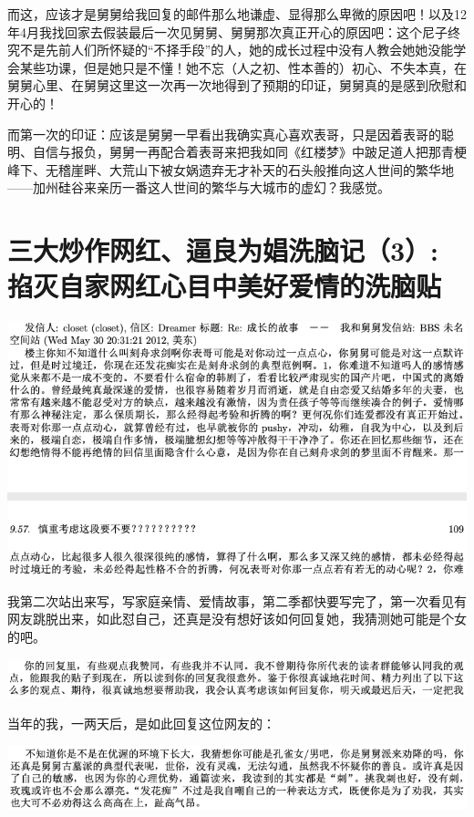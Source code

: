 \documentclass[9pt, b5paper]{article}
\begin{document}
而这，应该才是舅舅给我回复的邮件那么地谦虚、显得那么卑微的原因吧！以及12年4月我找回家去假装最后一次见舅舅、舅舅那次真正开心的原因吧：这个尼子终究不是先前人们所怀疑的“不择手段”的人，她的成长过程中没有人教会她她没能学会某些功课，但是她只是不懂！她不忘（人之初、性本善的）初心、不失本真，在舅舅心里、在舅舅这里这一次再一次地得到了预期的印证，舅舅真的是感到欣慰和开心的！

而第一次的印证：应该是舅舅一早看出我确实真心喜欢表哥，只是因着表哥的聪明、自信与报负，舅舅一再配合着表哥来把我如同《红楼梦》中跛足道人把那青梗峰下、无稽崖畔、大荒山下被女娲遗弃无才补天的石头般推向这人世间的繁华地——加州硅谷来亲历一番这人世间的繁华与大城市的虚幻？我感觉。

\section{三大炒作网红、逼良为娼洗脑记（3）: 掐灭自家网红心目中美好爱情的洗脑贴}
\label{sec:orgf2cd519}

\begin{center}
\includegraphics[width=.9\linewidth]{./pic/p1p108-3.png}
\end{center}

我第二次站出来写，写家庭亲情、爱情故事，第二季都快要写完了，第一次看见有网友跳脱出来，如此怼自己，还真是没有想好该如何回复她，我猜测她可能是个女的吧。 

\begin{center}
\includegraphics[width=.9\linewidth]{./pic/p1p114.png}
\end{center}

当年的我，一两天后，是如此回复这位网友的：

\begin{center}
\includegraphics[width=.9\linewidth]{./pic/p1p114-1.png}
\end{center}
\end{document}
